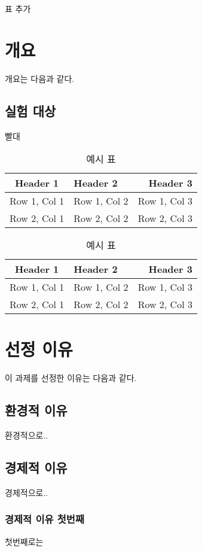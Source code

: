 \documentclass{article}
\begin{document}
{\Huge 표 추가}

\section{개요}
개요는 다음과 같다.

\subsection{실험 대상}
빨대

\begin{table}   
\caption{예시 표}
\begin{tabular}{|c|l|r|}
\hline
Header 1 & Header 2 & Header 3 \\ %
\hline
Row 1, Col 1 & Row 1, Col 2 & Row 1, Col 3 \\
Row 2, Col 1 & Row 2, Col 2 & Row 2, Col 3 \\
\hline
\end{tabular}
\end{table}

\begin{table}[h]
\caption{예시 표}
\begin{tabular}{|c|l|r|}
\hline
Header 1 & Header 2 & Header 3 \\ %
\hline
Row 1, Col 1 & Row 1, Col 2 & Row 1, Col 3 \\
Row 2, Col 1 & Row 2, Col 2 & Row 2, Col 3 \\
\hline
\end{tabular}
\end{table}

\section{선정 이유}
이 과제를 선정한 이유는 다음과 같다. 

\subsection{환경적 이유}
환경적으로.. 

\subsection{경제적 이유}
경제적으로.. 

\subsubsection{경제적 이유 첫번째}
첫번째로는
\end{document}
